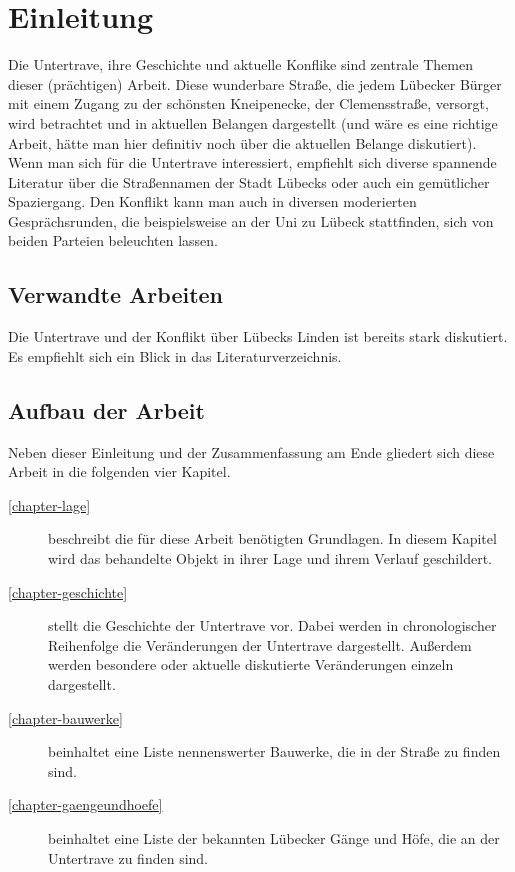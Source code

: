 
\chapter{Einleitung}
Die Untertrave, ihre Geschichte und aktuelle Konflike sind zentrale Themen dieser (prächtigen) Arbeit. Diese wunderbare Straße, die jedem Lübecker Bürger mit einem Zugang zu der schönsten Kneipenecke, der Clemensstraße, versorgt, wird betrachtet und in aktuellen Belangen dargestellt (und wäre es eine richtige Arbeit, hätte man hier definitiv noch über die aktuellen Belange diskutiert).
Wenn man sich für die Untertrave interessiert, empfiehlt sich diverse spannende Literatur über die Straßennamen der Stadt Lübecks oder auch ein gemütlicher Spaziergang.
Den Konflikt kann man auch in diversen moderierten Gesprächsrunden, die beispielsweise an der Uni zu Lübeck stattfinden, sich von beiden Parteien beleuchten lassen.

\section{Verwandte Arbeiten}

Die Untertrave und der Konflikt über Lübecks Linden ist bereits stark diskutiert. Es empfiehlt sich ein Blick in das Literaturverzeichnis. \cite{llllweb}

\section{Aufbau der Arbeit}

Neben dieser Einleitung und der Zusammenfassung am Ende gliedert sich diese Arbeit in die folgenden vier Kapitel.
\begin{description}
  \item[\ref{chapter-lage}] beschreibt die für diese Arbeit benötigten Grundlagen. In diesem Kapitel wird das behandelte Objekt in ihrer Lage und ihrem Verlauf geschildert.
  \item[\ref{chapter-geschichte}] stellt die Geschichte der Untertrave vor. Dabei werden in chronologischer Reihenfolge die Veränderungen der Untertrave dargestellt. Außerdem werden besondere oder aktuelle diskutierte Veränderungen einzeln dargestellt.
  \item[\ref{chapter-bauwerke}] beinhaltet eine Liste nennenswerter Bauwerke, die in der Straße zu finden sind.
  \item[\ref{chapter-gaengeundhoefe}] beinhaltet eine Liste der bekannten Lübecker Gänge und Höfe, die an der Untertrave zu finden sind.
\end{description}

